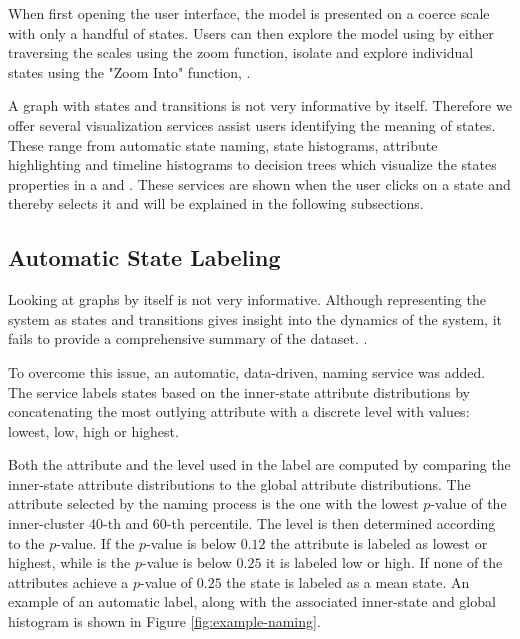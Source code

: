 When first opening the user interface, the model is presented on a coerce scale with only a handful
of states. Users can then explore the model using by either traversing the scales using the zoom 
function, isolate and explore individual states using the "Zoom Into" function, .

A graph with states and transitions is not very informative by itself. Therefore we offer several 
visualization services assist users identifying the meaning of states. These range from automatic
state naming, state histograms, attribute highlighting and timeline histograms to decision trees
which visualize the states properties in a  and .
These services are shown when the user clicks on a state and thereby selects it and will be 
explained in the following subsections.

\subsection{Automatic State Labeling}

Looking at graphs by itself is not very informative. Although representing the system as states and 
transitions gives insight into the dynamics of the system, it fails to provide a comprehensive summary 
of the dataset. .

To overcome this issue, an automatic, data-driven, naming service was added. The service labels
states based on the inner-state attribute distributions by concatenating the most outlying attribute
with a discrete level with values: lowest, low, high or highest.

Both the attribute and the level used in the label are computed by comparing the inner-state attribute
distributions to the global attribute distributions. The attribute selected by the naming process is
the one with the lowest $p$-value of the inner-cluster $40$-th and $60$-th percentile. The level is
then determined according to the $p$-value. If the $p$-value is below $0.12$ the attribute is labeled
as lowest or highest, while is the $p$-value is below $0.25$ it is labeled low or high. If none of the
attributes achieve a $p$-value of $0.25$ the state is labeled as a mean state. An example of an automatic
label, along with the associated inner-state and global histogram is shown in Figure \ref{fig:example-naming}.

